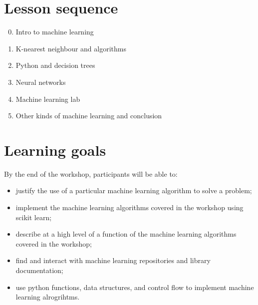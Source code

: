 \documentclass[11pt]{article}
\begin{document}
\vfill
\section*{Lesson sequence}

\begin{enumerate}
    \setcounter{enumi}{-1}
  \item Intro to machine learning
  \item K-nearest neighbour and algorithms
  \item Python and decision trees
  \item Neural networks
  \item Machine learning lab
  \item Other kinds of machine learning and conclusion
\end{enumerate}

\section*{Learning goals}

By the end of the workshop, participants will be able to:

\begin{itemize}
  \item justify the use of a particular machine learning algorithm to solve a problem;
  \item implement the machine learning algorithms covered in the workshop using scikit learn;
  \item describe at a high level of a function of the machine learning algorithms covered in the workshop;
  \item find and interact with machine learning repositories and library documentation;
  \item use python functions, data structures, and control flow to
    implement machine learning alrogrihtms.
\end{itemize}
\end{document}
